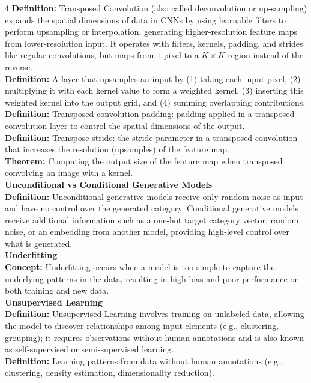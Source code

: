\documentclass[8pt]{extarticle}
\begin{document}
\begin{multicols}{4}
\textbf{Definition:} Transposed Convolution (also called deconvolution or up‑sampling) expands the spatial dimensions of data in CNNs by using learnable filters to perform upsampling or interpolation, generating higher‑resolution feature maps from lower‑resolution input. It operates with filters, kernels, padding, and strides like regular convolutions, but maps from $1$ pixel to a $K \times K$ region instead of the reverse.\\
\textbf{Definition:} A layer that upsamples an input by (1) taking each input pixel, (2) multiplying it with each kernel value to form a weighted kernel, (3) inserting this weighted kernel into the output grid, and (4) summing overlapping contributions.\\
\textbf{Definition:} Transposed convolution padding: padding applied in a transposed convolution layer to control the spatial dimensions of the output.\\
\textbf{Definition:} Transpose stride: the stride parameter in a transposed convolution that increases the resolution (upsamples) of the feature map.\\
\textbf{Theorem:} Computing the output size of the feature map when transposed convolving an image with a kernel.\\

\vspace{2pt}\textbf{Unconditional vs Conditional Generative Models}\\
\textbf{Definition:} Unconditional generative models receive only random noise as input and have no control over the generated category. Conditional generative models receive additional information such as a one‑hot target category vector, random noise, or an embedding from another model, providing high‑level control over what is generated.\\

\vspace{2pt}\textbf{Underfitting}\\
\textbf{Concept:} Underfitting occurs when a model is too simple to capture the underlying patterns in the data, resulting in high bias and poor performance on both training and new data.\\

\vspace{2pt}\textbf{Unsupervised Learning}\\
\textbf{Definition:} Unsupervised Learning involves training on unlabeled data, allowing the model to discover relationships among input elements (e.g., clustering, grouping); it requires observations without human annotations and is also known as self‑supervised or semi‑supervised learning.\\
\textbf{Definition:} Learning patterns from data without human annotations (e.g., clustering, density estimation, dimensionality reduction).\\


\end{multicols}
\end{document}
